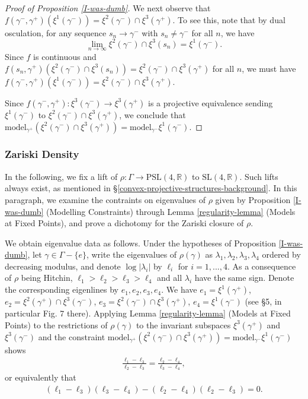 \documentclass[12pt,a4paper]{amsart}
\newcommand{\bbR}{\mathbb R}
\theoremstyle{definition}
\theoremstyle{plain}
\numberwithin{equation}{section}
\begin{document}
\begin{proof}[Proof of Proposition \ref{I-was-dumb}]
We next observe that $f(\gamma^-, \gamma^+)(\xi^1(\gamma^-)) = \xi^2(\gamma^-) \cap \xi^3(\gamma^+)$. To see this, note that by dual osculation, for any sequence $s_n \to \gamma^-$ with $s_n \neq \gamma^-$ for all $n$, we have $$\lim\limits_{n \to \infty} \xi^2(\gamma^-) \cap \xi^3(s_n) = \xi^1(\gamma^-).$$ Since $f$ is continuous and $f(s_n, \gamma^+)(\xi^2(\gamma^-) \cap \xi^3(s_n)) = \xi^2(\gamma^-) \cap \xi^3(\gamma^+)$ for all $n$, we must have $f(\gamma^-, \gamma^+)(\xi^1(\gamma^-)) = \xi^2(\gamma^-) \cap \xi^3(\gamma^+)$.
    
Since $f(\gamma^-, \gamma^+): \xi^3(\gamma^-) \to \xi^3(\gamma^+)$ is a projective equivalence sending $\xi^1(\gamma^-)$ to $\xi^2(\gamma^-) \cap \xi^3(\gamma^+)$, we conclude that $\text{model}_{\gamma^+}(\xi^2(\gamma^-) \cap \xi^3(\gamma^+)) = \text{model}_{\gamma^-} \xi^1(\gamma^-)$.
\end{proof}

\subsubsection{Zariski Density}\label{subsubsection-zariski-closures} 
In the following, we fix a lift of $\rho: \Gamma \to \text{PSL}(4,\bbR)$ to $\text{SL}(4,\bbR)$. Such lifts always exist, as mentioned in \S \ref{convex-projective-structures-background}. In this paragraph, we examine the contraints on eigenvalues of $\rho$ given by Proposition \ref{I-was-dumb} (Modelling Constraints) through Lemma \ref{regularity-lemma} (Models at Fixed Points), and prove a dichotomy for the Zariski closure of $\rho$.


We obtain eigenvalue data as follows. Under the hypotheses of Proposition \ref{I-was-dumb}, let $\gamma \in \Gamma - \{e\}$, write the eigenvalues of $\rho(\gamma)$ as $\lambda_1, \lambda_2, \lambda_3, \lambda_4$ ordered by decreasing modulus, and denote $\log |\lambda_i|$ by $\ell_i$ for $i=1,...,4$. As a consequence of $\rho$ being Hitchin, $\ell_1 > \ell_2 > \ell_3 > \ell_4$ and all $\lambda_i$ have the same sign. Denote the corresponding eigenlines by $e_1, e_2, e_3, e_4$. We have $e_1 = \xi^1(\gamma^+)$, $e_2 = \xi^2(\gamma^+) \cap\xi^3(\gamma^-)$, $e_3 = \xi^2(\gamma^-) \cap \xi^3(\gamma^+)$, $e_4 = \xi^1(\gamma^-)$ (see \cite{guichard2008convex} \S 5, in particular Fig. 7 there). Applying Lemma \ref{regularity-lemma} (Models at Fixed Points) to the restrictions of $\rho(\gamma)$ to the invariant subspaces $\xi^3(\gamma^+)$ and $\xi^3(\gamma^-)$ and the constraint $\text{model}_{\gamma^+} (\xi^2(\gamma^-) \cap \xi^3(\gamma^+) ) = \text{model}_{\gamma^-} \xi^1(\gamma^-)$ shows \begin{align}\label{eigenvalue-condition-from-regularity}
\frac{\ell_1 - \ell_3}{\ell_2 - \ell_3} = \frac{\ell_2 - \ell_4}{\ell_3 - \ell_4},
\end{align} or equivalently that
\begin{align}\label{eigenvalue-constraint-homogeneous-form}
(\ell_1 -\ell_3)(\ell_3 - \ell_4) - (\ell_2 - \ell_4)(\ell_2 - \ell_3) = 0.
\end{align}
\end{document}
